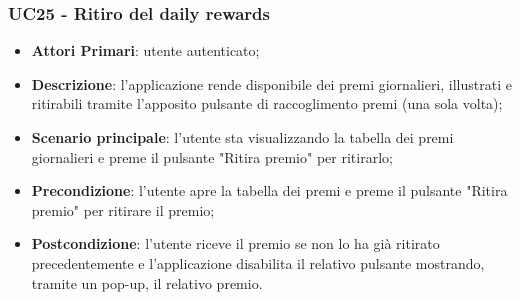 \subsubsection{UC25 - Ritiro del daily rewards}
\begin{itemize}
	\item \textbf{Attori Primari}: utente autenticato;
	\item \textbf{Descrizione}: l'applicazione rende disponibile dei premi giornalieri, illustrati e ritirabili tramite l'apposito pulsante di raccoglimento premi (una sola volta);
	\item \textbf{Scenario principale}: l'utente sta visualizzando la tabella dei premi giornalieri e preme il pulsante "Ritira premio" per ritirarlo;
	\item \textbf{Precondizione}: l'utente apre la tabella dei premi e preme il pulsante "Ritira premio" per ritirare il premio;
	\item \textbf{Postcondizione}: l'utente riceve il premio se non lo ha già ritirato precedentemente e l'applicazione disabilita il relativo pulsante mostrando, tramite un pop-up, il relativo premio.  
\end{itemize} 